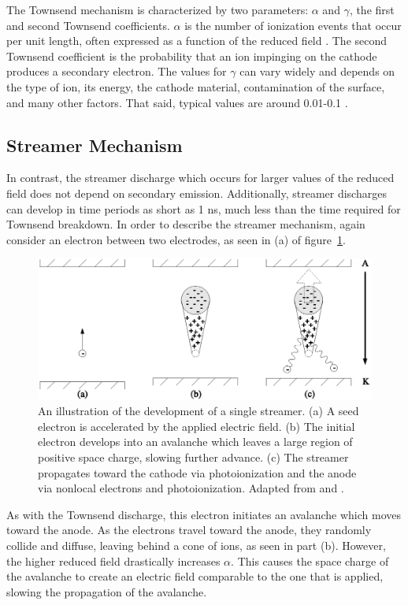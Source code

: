 The Townsend mechanism is characterized by two parameters: $\alpha$ and
$\gamma$, the first and second Townsend coefficients. $\alpha$ is the number of
ionization events that occur per unit length, often expressed as a function of
the reduced field \cite{Druyvesteyn1940}. The second Townsend coefficient is the
probability that an ion impinging on the cathode produces a secondary electron.
The values for $\gamma$ can vary widely and depends on the type of ion, its
energy, the cathode material, contamination of the surface, and many other
factors. That said, typical values are around 0.01-0.1 \cite{Lieberman2005}.

\subsection{Streamer Mechanism}

In contrast, the streamer discharge which occurs for larger values of the
reduced field does not depend on secondary emission. Additionally, streamer
discharges can develop in time periods as short as 1 ns, much less than the time
required for Townsend breakdown. In order to describe the streamer mechanism,
again consider an electron between two electrodes, as seen in (a) of
figure~\ref{fig:streamer}.
\begin{figure}
  \centering
  \includegraphics{./chapters/theory/figures/streamer.eps}
  \caption{An illustration of the development of a single streamer. (a)
    A seed electron is accelerated by the applied electric field. (b) The
    initial electron develops into an avalanche which leaves a large region
    of positive space charge, slowing further advance. (c) The streamer
    propagates toward the cathode via photoionization and the anode via
    nonlocal electrons and photoionization. Adapted from \cite{Levatter1980} and
    \cite{Kunhardt1980}.}
  \label{fig:streamer}
\end{figure}
As with the Townsend discharge, this electron initiates an avalanche which moves
toward the anode. As the electrons travel toward the anode, they randomly
collide and diffuse, leaving behind a cone of ions, as seen in part (b).
However, the higher reduced field drastically increases $\alpha$. This causes
the space charge of the avalanche to create an electric field comparable to the
one that is applied, slowing the propagation of the avalanche.

